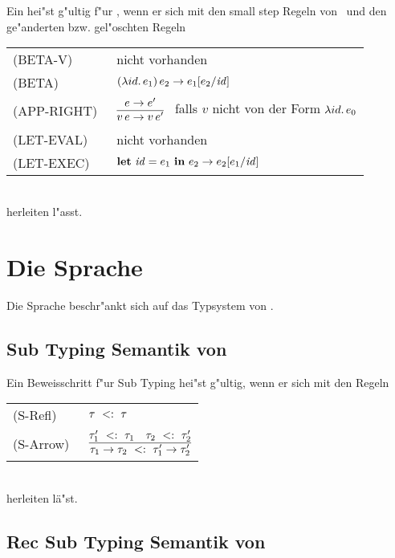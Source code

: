 Ein  hei"st g"ultig f"ur \LONECBN, wenn er sich mit den small step Regeln von \LONE\ 
und den ge"anderten bzw. gel"oschten Regeln\\[5mm]
  \begin{tabular}{ll}
     \mbox{(BETA-V)}      & nicht vorhanden \\[3mm]
     \mbox{(BETA)}        & $(\lambda id.\,e_1)\,e_2 \to e_1[e_2/{\text{\it id\/}}]$ \\[5mm]
     \mbox{(APP-RIGHT)\ } & $\regel{e \to e'}
                                   {v\,e \to v\,e'}$   \ 
                                   falls ${v}$ nicht von der Form $\lambda id.\,e_0$ \\[5mm]
     \mbox{(LET-EVAL)\  } & nicht vorhanden \\[3mm]
     \mbox{(LET-EXEC)}    & $\textbf{let}\ {\text{\it id\/}} = e_1\ \textbf{in}\ e_2 \to e_2[e_1/{\text{\it id\/}}]$
  \end{tabular}\\[7mm]
herleiten l"asst.

\section{Die Sprache \LONESUB}
Die Sprache \LONESUB beschr"ankt sich auf das Typsystem von \LONE. 

\subsection{Sub Typing Semantik von \LONESUB}

Ein Beweisschritt f"ur Sub Typing hei"st g"ultig, wenn er sich mit den Regeln  \\[5mm]
  \begin{tabular}{ll}
    \mbox{(S-Refl)\ }       & $\tau\ <:\ \tau$  \\[1mm]
    \mbox{(S-Arrow)\ }      & $\RULE{\subtype{\tau_1'} {\tau_1} \quad \subtype {\tau_2} {\tau_2'}}
                              {\subtype{\typeArrow{\tau_1}{\tau_2}} {\typeArrow{\tau_1'}{\tau_2'}}}$ \\[4mm]
  \end{tabular} \\[7mm]

herleiten l\"a"st.

\subsection{Rec Sub Typing Semantik von \LONESUB}

